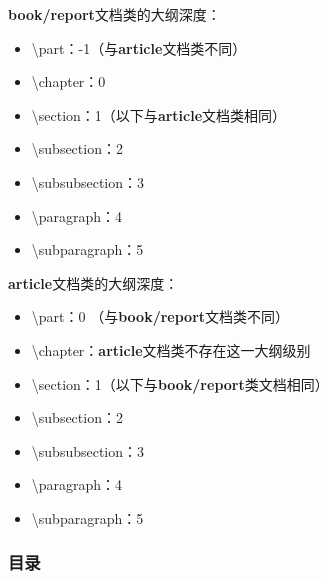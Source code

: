             \textbf{book/report}文档类的大纲深度：

            \begin{itemize}
                \item \textbackslash part：-1（与\textbf{article}文档类不同）
                \item \textbackslash chapter：0
                \item \textbackslash section：1（以下与\textbf{article}文档类相同）
                \item \textbackslash subsection：2
                \item \textbackslash subsubsection：3
                \item \textbackslash paragraph：4
                \item \textbackslash subparagraph：5
            \end{itemize}

            \textbf{article}文档类的大纲深度：

            \begin{itemize}
                \item \textbackslash part：0 （与\textbf{book/report}文档类不同）
                \item \textbackslash chapter：\textbf{article}文档类不存在这一大纲级别
                \item \textbackslash section：1（以下与\textbf{book/report}类文档相同）
                \item \textbackslash subsection：2
                \item \textbackslash subsubsection：3
                \item \textbackslash paragraph：4
                \item \textbackslash subparagraph：5
            \end{itemize}


        \subsubsection{目录}

